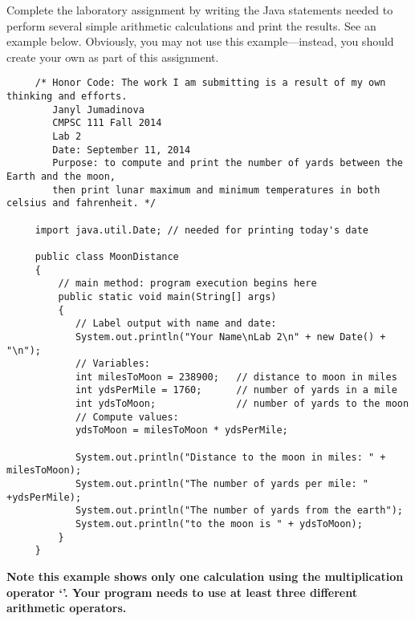  Complete the laboratory assignment by writing the Java statements needed to perform several simple arithmetic
 calculations and print the results. See an example below. Obviously, you may not use this example---instead, you should
 create your own as part of this assignment.

\begin{verbatim}
     /* Honor Code: The work I am submitting is a result of my own thinking and efforts.
        Janyl Jumadinova
        CMPSC 111 Fall 2014
        Lab 2
        Date: September 11, 2014
        Purpose: to compute and print the number of yards between the Earth and the moon, 
        then print lunar maximum and minimum temperatures in both celsius and fahrenheit. */
 
     import java.util.Date; // needed for printing today's date
     
     public class MoonDistance
     {
         // main method: program execution begins here
         public static void main(String[] args)
         {
            // Label output with name and date:
            System.out.println("Your Name\nLab 2\n" + new Date() + "\n");     
            // Variables:
            int milesToMoon = 238900;   // distance to moon in miles
            int ydsPerMile = 1760;      // number of yards in a mile
            int ydsToMoon;              // number of yards to the moon           
            // Compute values:
            ydsToMoon = milesToMoon * ydsPerMile;
            
            System.out.println("Distance to the moon in miles: " + milesToMoon);
            System.out.println("The number of yards per mile: " +ydsPerMile);
            System.out.println("The number of yards from the earth");
            System.out.println("to the moon is " + ydsToMoon);
         }
     }
\end{verbatim}

\noindent \textbf{Note this example shows only one calculation using the multiplication operator `{\tt *}'. Your program
needs to use at least three different arithmetic operators. }

\vspace*{-.2in}
